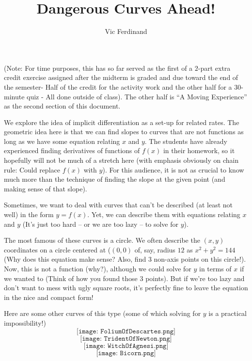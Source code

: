 \documentclass{ximera}
\author{Vic Ferdinand}
\title{Dangerous Curves Ahead!}
\begin{document}
\begin{abstract}
\end{abstract}
\maketitle

\begin{instructorIntro}

(Note: For time purposes, this has so far served as the first of a $2$-part extra credit exercise assigned after the midterm is graded and due toward the end of the semester- Half of the credit for the activity work and the other half for a $30$-minute quiz - All done outside of class).  The other half is ``A Moving Experience'' as the second section of this document.


We explore the idea of implicit differentiation as a set-up for related rates.  The geometric idea here is that we can find slopes to curves that are not functions as long as we have some equation relating $x$ and $y$.  The students have already experienced finding derivatives of functions of $f(x)$ in their homework, so it hopefully will not be much of a stretch here (with emphasis obviously on chain rule:  Could replace $f(x)$ with $y$).  For this audience, it is not as crucial to know much more than the technique of finding the slope at the given point (and making sense of that slope).
\end{instructorIntro}



Sometimes, we want to deal with curves that can't be described (at least not well) in the form  $y=f(x)$.  Yet, we can describe them with equations relating $x$ and $y$ (It's just too hard – or we are too lazy – to solve for $y$).

 The most famous of these curves is a circle.  We often describe the $(x, y)$ coordinates on a circle centered at ($(0, 0)$ of, say, radius $12$ as $x^2+y^2=144$ (Why does this equation make sense?  Also, find $3$ non-axis points on this circle!).  Now, this is not a function (why?), although we could solve for $y$ in terms of $x$ if we wanted to (Think of how you found those $3$ points).  But if we're too lazy and don't want to mess with ugly square roots, it's perfectly fine to leave the equation in the nice and compact  form!
 
Here are some other curves of this type (some of which solving for $y$ is a practical impossibility!)
\[
\texttt{[image: FoliumOfDescartes.png]}
\]
\[
\texttt{[image: TridentOfNewton.png]}
\]
\[
\texttt{[image: WitchOfAgnesi.png]}
\]
\[
\texttt{[image: Bicorn.png]}
\]
\end{document}
